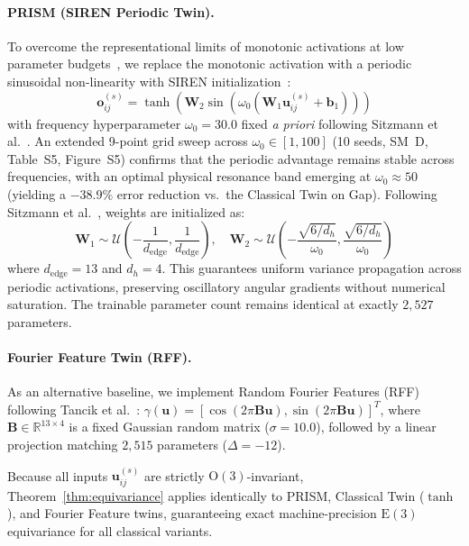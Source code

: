 \documentclass[10pt,twocolumn,letterpaper]{article}
\begin{document}
\paragraph{PRISM (SIREN Periodic Twin).}
To overcome the representational limits of monotonic activations at low parameter budgets~\cite{rahaman2019spectral, sitzmann2020siren}, we replace the monotonic activation with a periodic sinusoidal non-linearity with SIREN initialization~\cite{sitzmann2020siren}:
\begin{equation}
    \mathbf{o}_{ij}^{(s)} = \tanh\left(\mathbf{W}_2 \sin\left(\omega_0 (\mathbf{W}_1 \mathbf{u}_{ij}^{(s)} + \mathbf{b}_1)\right)\right)
\end{equation}
with frequency hyperparameter $\omega_0 = 30.0$ fixed \textit{a priori} following Sitzmann et al.~\cite{sitzmann2020siren}. An extended 9-point grid sweep across $\omega_0 \in [1, 100]$ (10 seeds, SM~D, Table~S5, Figure~S5) confirms that the periodic advantage remains stable across frequencies, with an optimal physical resonance band emerging at $\omega_0 \approx 50$ (yielding a $-38.9\%$ error reduction vs.\ the Classical Twin on Gap).
Following Sitzmann et al.~\cite{sitzmann2020siren}, weights are initialized as:
\begin{equation}
    \mathbf{W}_1 \sim \mathcal{U}\left(-\frac{1}{d_{\mathrm{edge}}}, \frac{1}{d_{\mathrm{edge}}}\right), \quad \mathbf{W}_2 \sim \mathcal{U}\left(-\frac{\sqrt{6/d_h}}{\omega_0}, \frac{\sqrt{6/d_h}}{\omega_0}\right)
\end{equation}
where $d_{\mathrm{edge}} = 13$ and $d_h = 4$.
This guarantees uniform variance propagation across periodic activations, preserving oscillatory angular gradients without numerical saturation. The trainable parameter count remains identical at exactly $2{,}527$ parameters.
\paragraph{Fourier Feature Twin (RFF).}
As an alternative baseline, we implement Random Fourier Features (RFF) following Tancik et al.~\cite{tancik2020fourier}:
$\gamma(\mathbf{u}) = [\cos(2\pi \mathbf{B}\mathbf{u}), \sin(2\pi \mathbf{B}\mathbf{u})]^T$, where $\mathbf{B} \in \mathbb{R}^{13 \times 4}$ is a fixed Gaussian random matrix ($\sigma = 10.0$), followed by a linear projection matching $2{,}515$ parameters ($\Delta = -12$).

Because all inputs $\mathbf{u}_{ij}^{(s)}$ are strictly $\mathrm{O}(3)$-invariant, Theorem~\ref{thm:equivariance} applies identically to PRISM, Classical Twin ($\tanh$), and Fourier Feature twins, guaranteeing exact machine-precision $\mathrm{E}(3)$ equivariance for all classical variants.
\end{document}
